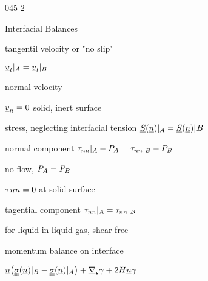 \begin{mitframe} {045-2}
\begin{listone}
	\item Interfacial Balances
    \begin{listtwo}
    	\item tangentil velocity or "no slip"
        \begin{listthree}
        	\item $\uline{\vvel}_t|_{\helmholtz}=\uline{\vvel}_t|_{\exergy}$
                    \end{listthree}
         \item normal velocity
         	\begin{listthree}
            		\item $\uline{\vvel}_n=0$ solid, inert surface
            \end{listthree}
      \item stress, neglecting interfacial tension $\stressvec(\normvec)|_{\helmholtz}=\stressvec(\normvec)|_{}\exergy$
	                \begin {listthree}
        		\item normal component $\torque_{nn}|_{\helmholtz}-\p_{\helmholtz}=\torque_{nn}|_{\exergy}-\p_{\exergy}$
                    \begin{listfour}
                	\item no flow, $\p_{\helmholtz}=\p_{\exergy}$
                    \item $\torque{nn}=0$  at solid surface
                \end{listfour}
                \item  tagential component $\torque_{nn}|_{\helmholtz}=\torque_{nn}|_{\exergy}$
                	\begin{listfour}
                    	\item for liquid in liquid gas, shear free
                    \end{listfour}
                \end{listthree}
             \item momentum balance on interface
             	\begin{listthree}
                		\item $\normvec\big(\stresstens(\normvec)|_{\exergy}-\stresstens(\normvec)|_{\helmholtz}\big)+\gradop_{s}\gamma+2\enthalpy\normvec\gamma$
                      

\end{listthree}
\end{listtwo}
\end{listone}
\end{mitframe}
